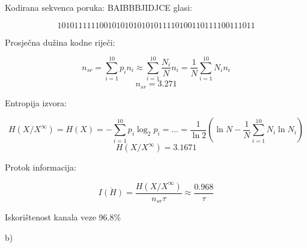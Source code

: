 \documentclass[12pt]{article}
\begin{document}
Kodirana sekvenca poruka: BAIBBBJIDJCE glasi:

$$10101111110010101010101011110100110111100111011$$

Prosječna dužina kodne riječi: 

$$n_{sr} = \sum_{i = 1}^{10} p_i n_i \approx \sum_{i = 1}^{10} \frac{N_i}{N} n_i = \frac{1}{N} \sum_{i = 1}^{10} N_i n_i$$
$$n_{sr} = 3.271$$

Entropija izvora:

$$H(X/X^{\infty}) = H(X) =  - \sum_{i = 1}^{10} p_i \log_{2}p_i = ... = \frac{1}{\ln{2}} (\ln{N} - \frac{1}{N} \sum_{i = 1}^{10} N_i \ln{N_i})$$
$$H(X/X^{\infty}) = 3.1671$$

Protok informacija:

$$\overline{I(H)} = \frac{H(X/X^{\infty}) }{n_{sr} \tau} \approx \frac{0.968}{\tau}$$

Iskorištenost kanala veze 96.8\%

b)\\
\end{document}
